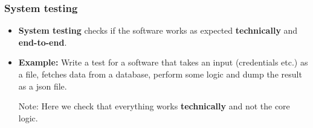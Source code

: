\documentclass[9pt,xcolor=dvipsnames]{beamer}
\begin{document}
\begin{frame}
  \frametitle{System testing}
  \begin{overlayarea}{\textwidth}{\textheight}
  \begin{itemize}
    \item \textbf{System testing} checks if the software works as
      expected \textbf{technically} and \textbf{end-to-end}.
    \item \textbf{Example:} Write a test for a software that takes an
      input (credentials etc.) as a file, fetches data from a
      database, perform some logic and dump the result as a json file.
\begin{table}[ht]
  \begin{minipage}[t]{0.45\linewidth} \centering
  \end{minipage}	
  \begin{minipage}[t]{0.35\linewidth}
    \pause
    Note: Here we check that everything works \textbf{technically} and not the
    core logic.
  \end{minipage}	
\end{table}
  \end{itemize}
  \end{overlayarea}
\end{frame}
\end{document}

